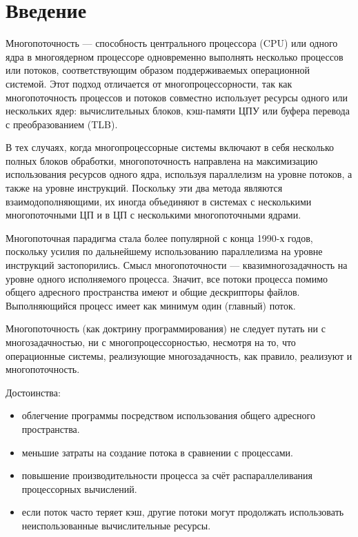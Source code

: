 \chapter*{Введение}

Многопоточность — способность центрального процессора (CPU) или одного ядра в многоядерном процессоре одновременно выполнять несколько процессов или потоков, соответствующим образом поддерживаемых операционной системой.
Этот подход отличается от многопроцессорности, так как многопоточность процессов и потоков совместно использует ресурсы одного или нескольких ядер: вычислительных блоков, кэш-памяти ЦПУ или буфера перевода с преобразованием (TLB).

В тех случаях, когда многопроцессорные системы включают в себя несколько полных блоков обработки, многопоточность направлена на максимизацию использования ресурсов одного ядра, используя параллелизм на уровне потоков, а также на уровне инструкций.
Поскольку эти два метода являются взаимодополняющими, их иногда объединяют в системах с несколькими многопоточными ЦП и в ЦП с несколькими многопоточными ядрами.

Многопоточная парадигма стала более популярной с конца 1990-х годов, поскольку усилия по дальнейшему использованию параллелизма на уровне инструкций застопорились.
Смысл многопоточности — квазимногозадачность на уровне одного исполняемого процесса.
Значит, все потоки процесса помимо общего адресного пространства имеют и общие дескрипторы файлов. Выполняющийся процесс имеет как минимум один (главный) поток.

Многопоточность (как доктрину программирования) не следует путать ни с многозадачностью, ни с многопроцессорностью, несмотря на то, что операционные системы, реализующие многозадачность, как правило, реализуют и многопоточность.

Достоинства:
\begin{itemize}
	\item облегчение программы посредством использования общего адресного пространства.
	\item меньшие затраты на создание потока в сравнении с процессами.
	\item повышение производительности процесса за счёт распараллеливания процессорных вычислений.
	\item если поток часто теряет кэш, другие потоки могут продолжать использовать неиспользованные вычислительные ресурсы.
\end{itemize}

